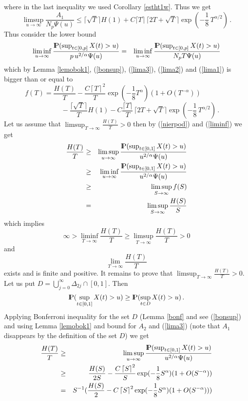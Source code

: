 where in the last inequality we used Corollary \ref{estht1w}. Thus we get
\begin{equation}\label{lima1}
\limsup_{u\rightarrow\infty}\frac{A_1}{N_p\Psi(u)}\leq
\lceil \sqrt{T}\rceil H(1)+C\lceil T \rceil
\,\lceil 2T+\sqrt{T} \rceil \exp(-\frac{1}{8}\,T^{\alpha/2})\,.
\end{equation}
Thus consider the lower bound
\begin{eqnarray*}
\liminf_{u\rightarrow\infty}\frac{{\rm I\hspace{-0.8mm}P}(\sup_{t\in [0,p]} X(t)>u)}{p\,u^{2/\alpha}\Psi(u)}
&=& \liminf_{u\rightarrow\infty}\frac{{\rm I\hspace{-0.8mm}P}(\sup_{t\in [0,p]} X(t)>u)}{N_p T\Psi(u)}
\end{eqnarray*}
which by Lemma \ref{lemobok1}, (\ref{bonsup}), (\ref{lima3}), (\ref{lima2}) and (\ref{lima1}) is bigger than or equal to
\begin{equation}\label{liminf}
f(T)=\frac{H(T)}{T}-
\frac{C\left\lceil T\right\rceil^2}{T}\exp(-\frac{1}{8}T^\alpha)(1+O(T^{-\alpha}))
\,\,\,\,\,\,\,\,\,\,\,\,\,\,\,\,\,\,\,\,\,\,\,\,
\end{equation}
$$
\,\,\,\,\,\,\,\,\,\,\,\,\,\,\,\,\,\,\,\,\,\,\,\,
-\frac{\lceil \sqrt{T}\rceil}{T} H(1)-C\frac{\lceil T \rceil}{T}
\,\lceil 2T+\sqrt{T} \rceil \exp(-\frac{1}{8}\,T^{\alpha/2})\,.
$$
Let us assume that $\limsup_{T\rightarrow\infty}\frac{H(T)}{T}>0$ then by (\ref{nierpod}) and
(\ref{liminf}) we get
\begin{eqnarray*}
\frac{H(T)}{T}&\geq &\limsup_{u\rightarrow\infty}\frac{{\rm I\hspace{-0.8mm}P}(\sup_{t\in [0,1]} X(t)>u)}{u^{2/\alpha}\Psi(u)}\\
&\geq &\liminf_{u\rightarrow\infty}\frac{{\rm I\hspace{-0.8mm}P}(\sup_{t\in [0,1]} X(t)>u)}{u^{2/\alpha}\Psi(u)}\\
&\geq & \limsup_{S\rightarrow\infty}f(S)\\
&=& \limsup_{S\rightarrow\infty}\frac{H(S)}{S}
\end{eqnarray*}
which implies
$$
\infty >\liminf_{T\rightarrow\infty}\frac{H(T)}{T}
\geq \limsup_{T\rightarrow\infty}\frac{H(T)}{T}>0
$$
and
$$
\lim_{T\rightarrow\infty}\frac{H(T)}{T}
$$
exists and is finite and positive.
It remains to prove that $\limsup_{T\rightarrow\infty}\frac{H(T)}{T}>0$.
Let us put $D=\bigcup_{j=0}^\infty\Delta_{2j}\cap [0,1]$. Then
$$
{\rm I\hspace{-0.8mm}P}(\sup_{t\in [0,1]}X(t)>u)\geq {\rm I\hspace{-0.8mm}P}(\sup_{t\in D}X(t)>u)\,.
$$
Applying Bonferroni inequality for the set $D$ (Lemma \ref{bonf} and see (\ref{bonsup}) 
and using Lemma \ref{lemobok1} and bound for $A_2$ and (\ref{lima3}) (note that $A_1$ disappears by the definition
of the set $D$) we get
\begin{eqnarray*}
\frac{H(T)}{T}&\geq &\limsup_{u\rightarrow\infty}\frac{{\rm I\hspace{-0.8mm}P}(\sup_{t\in [0,1]} X(t)>u)}{u^{2/\alpha}\Psi(u)}\\
&\geq & \frac{H(S)}{2S}-\frac{C\left\lceil S\right\rceil^2}{S}\exp(-\frac{1}{8}S^\alpha)(1+O(S^{-\alpha}))\\
&= & S^{-1}(\frac{H(S)}{2}-C\left\lceil S\right\rceil^2\exp(-\frac{1}{8}S^\alpha)(1+O(S^{-\alpha})))
\end{eqnarray*}
